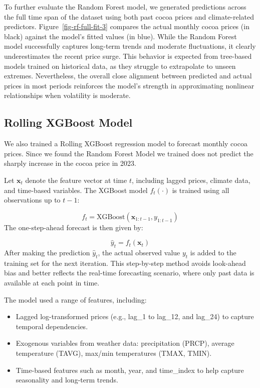 \documentclass[
  letterpaper,
  DIV=11,
  numbers=noendperiod]{scrartcl}
\begin{document}
To further evaluate the Random Forest model, we generated predictions
across the full time span of the dataset using both past cocoa prices
and climate-related predictors. Figure~\ref{fig-rf-full-fit-3} compares
the actual monthly cocoa prices (in black) against the model's fitted
values (in blue). While the Random Forest model successfully captures
long-term trends and moderate fluctuations, it clearly underestimates
the recent price surge. This behavior is expected from tree-based models
trained on historical data, as they struggle to extrapolate to unseen
extremes. Nevertheless, the overall close alignment between predicted
and actual prices in most periods reinforces the model's strength in
approximating nonlinear relationships when volatility is moderate.

\hypertarget{rolling-xgboost-model}{%
\subsection{Rolling XGBoost Model}\label{rolling-xgboost-model}}

We also trained a Rolling XGBoost regression model to forecast monthly
cocoa prices. Since we found the Random Forest Model we trained does not
predict the sharply increase in the cocoa price in 2023.

Let \(\mathbf{x}_t\) denote the feature vector at time \(t\), including
lagged prices, climate data, and time-based variables. The XGBoost model
\(f_t(\cdot)\) is trained using all observations up to \(t-1\):

\[f_t = \text{XGBoost}(\mathbf{x}_{1:t-1}, y_{1:t-1})\] The
one-step-ahead forecast is then given by:

\[\hat{y}_t = f_t(\mathbf{x}_t)\] After making the prediction
\(\hat{y}_t\), the actual observed value \(y_t\) is added to the
training set for the next iteration. This step-by-step method avoids
look-ahead bias and better reflects the real-time forecasting scenario,
where only past data is available at each point in time.

The model used a range of features, including:

\begin{itemize}
\item
  Lagged log-transformed prices (e.g., lag\_1 to lag\_12, and lag\_24)
  to capture temporal dependencies.
\item
  Exogenous variables from weather data: precipitation (PRCP), average
  temperature (TAVG), max/min temperatures (TMAX, TMIN).
\item
  Time-based features such as month, year, and time\_index to help
  capture seasonality and long-term trends.
\end{itemize}
\end{document}
